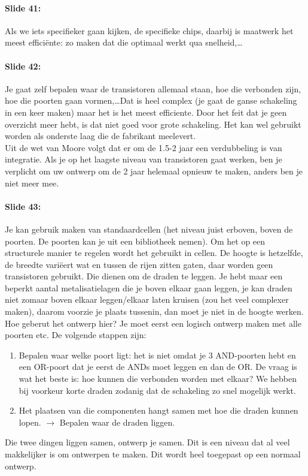 \documentclass[10pt,a4paper]{book}
\begin{document}
\paragraph{Slide 41:} Als we iets specifieker gaan kijken, de specifieke chips, daarbij is maatwerk het meest effici\"ente: zo maken dat die optimaal werkt qua snelheid,\ldots

\paragraph{Slide 42:} Je gaat zelf bepalen waar de transistoren allemaal staan, hoe die verbonden zijn, hoe die poorten gaan vormen,\ldots Dat is heel complex (je gaat de ganse schakeling in een keer maken) maar het is het meest efficiente. Door het feit dat je geen overzicht meer hebt, is dat niet goed voor grote schakeling. Het kan wel gebruikt worden als onderste laag die de fabrikant meelevert.\\
Uit de wet van Moore volgt dat  er om de 1.5-2 jaar een verdubbeling is van integratie. Als je op het laagste niveau van transistoren gaat werken, ben je verplicht om uw ontwerp om de 2 jaar helemaal opnieuw te maken, anders ben je niet meer mee.

\paragraph{Slide 43:} Je kan gebruik maken van standaardcellen (het niveau juist erboven, boven de poorten. De poorten kan je uit een bibliotheek nemen). Om het op een structurele manier te regelen wordt het gebruikt in cellen. De hoogte is hetzelfde, de breedte vari\"eert wat en tussen de rijen zitten gaten, daar worden geen transistoren gebruikt. Die dienen om de draden te leggen. Je hebt maar een beperkt aantal metalisatielagen die je boven elkaar gaan leggen, je kan draden niet zomaar boven elkaar leggen/elkaar laten kruisen (zou het veel complexer maken), daarom voorzie je plaats tussenin, dan moet je niet in de hoogte werken.\\
Hoe geberut het ontwerp hier? Je moet eerst een logisch ontwerp maken met alle poorten etc. De volgende stappen zijn:
\begin{enumerate}
\item Bepalen waar welke poort ligt: het is niet omdat je 3 AND-poorten hebt en een OR-poort dat je eerst de ANDs moet leggen en dan de OR. De vraag is wat het beste is: hoe kunnen die verbonden worden met elkaar? We hebben bij voorkeur korte draden zodanig dat de schakeling zo snel mogelijk werkt. 
\item Het plaatsen van die componenten hangt samen met hoe die draden kunnen lopen. $\rightarrow$ Bepalen waar de draden liggen.
\end{enumerate}
Die twee dingen liggen samen, ontwerp je samen. Dit is een niveau dat al veel makkelijker is om ontwerpen te maken. 
Dit wordt heel toegepast op een normaal ontwerp.
\end{document}
